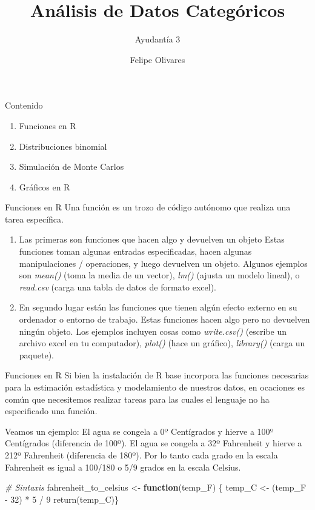 \documentclass[
  8pt,
  ignorenonframetext,
]{beamer}
\title{Análisis de Datos Categóricos}
\author{Ayudantía 3}
\date{Felipe Olivares}
\newenvironment{Shaded}{\begin{snugshade}}{\end{snugshade}}
\newcommand{\CommentTok}[1]{\textcolor[rgb]{0.56,0.35,0.01}{\textit{#1}}}
\newcommand{\ControlFlowTok}[1]{\textcolor[rgb]{0.13,0.29,0.53}{\textbf{#1}}}
\newcommand{\DecValTok}[1]{\textcolor[rgb]{0.00,0.00,0.81}{#1}}
\newcommand{\FunctionTok}[1]{\textcolor[rgb]{0.00,0.00,0.00}{#1}}
\newcommand{\NormalTok}[1]{#1}
\newcommand{\OtherTok}[1]{\textcolor[rgb]{0.56,0.35,0.01}{#1}}
\newcommand{\SpecialCharTok}[1]{\textcolor[rgb]{0.00,0.00,0.00}{#1}}
\begin{document}
\frame{\titlepage}

\begin{frame}{Contenido}
\protect\hypertarget{contenido}{}
\begin{enumerate}
\item
  Funciones en R
\item
  Distribuciones binomial
\item
  Simulación de Monte Carlos
\item
  Gráficos en R
\end{enumerate}
\end{frame}

\begin{frame}{Funciones en R}
\protect\hypertarget{funciones-en-r}{}
Una función es un trozo de código autónomo que realiza una tarea
específica.

\begin{enumerate}
\item
  Las primeras son funciones que hacen algo y devuelven un objeto Estas
  funciones toman algunas entradas especificadas, hacen algunas
  manipulaciones / operaciones, y luego devuelven un objeto. Algunos
  ejemplos son \emph{mean()} (toma la media de un vector), \emph{lm()}
  (ajusta un modelo lineal), o \emph{read.csv} (carga una tabla de datos
  de formato excel).
\item
  En segundo lugar están las funciones que tienen algún efecto externo
  en su ordenador o entorno de trabajo. Estas funciones hacen algo pero
  no devuelven ningún objeto. Los ejemplos incluyen cosas como
  \emph{write.csv()} (escribe un archivo excel en tu computador),
  \emph{plot()} (hace un gráfico), \emph{library()} (carga un paquete).
\end{enumerate}
\end{frame}

\begin{frame}[fragile]{Funciones en R}
\protect\hypertarget{funciones-en-r-1}{}
Si bien la instalación de R base incorpora las funciones necesarias para
la estimación estadística y modelamiento de nuestros datos, en ocaciones
es común que necesitemos realizar tareas para las cuales el lenguaje no
ha especificado una función.

Veamos un ejemplo: El agua se congela a 0º Centígrados y hierve a 100º
Centígrados (diferencia de 100º). El agua se congela a 32º Fahrenheit y
hierve a 212º Fahrenheit (diferencia de 180º). Por lo tanto cada grado
en la escala Fahrenheit es igual a 100/180 o 5/9 grados en la escala
Celsius.

\begin{Shaded}
\begin{Highlighting}[]
 \CommentTok{\# Sintaxis}
\NormalTok{fahrenheit\_to\_celsius }\OtherTok{\textless{}{-}} \ControlFlowTok{function}\NormalTok{(temp\_F) \{}
\NormalTok{  temp\_C }\OtherTok{\textless{}{-}}\NormalTok{ (temp\_F }\SpecialCharTok{{-}} \DecValTok{32}\NormalTok{) }\SpecialCharTok{*} \DecValTok{5} \SpecialCharTok{/} \DecValTok{9}
  \FunctionTok{return}\NormalTok{(temp\_C)\}}
\end{Highlighting}
\end{Shaded}
\end{frame}
\end{document}
